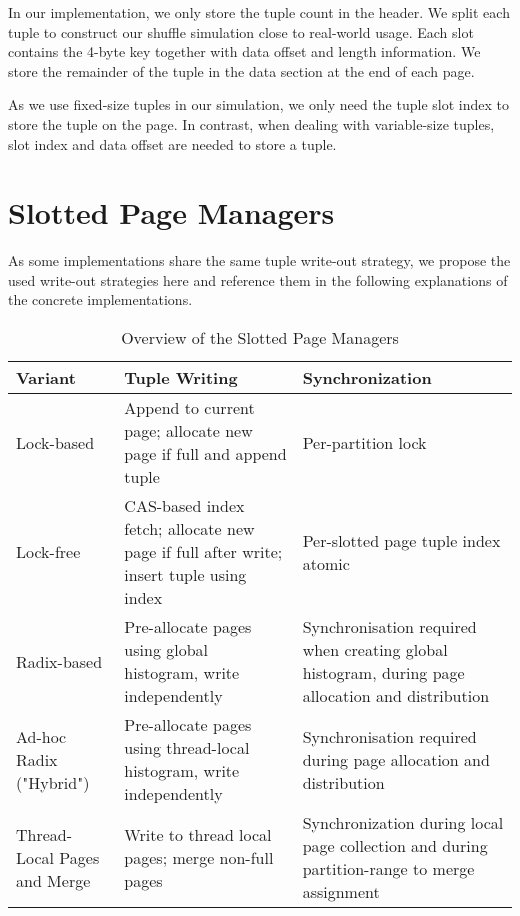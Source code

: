 In our implementation, we only store the tuple count in the header.
We split each tuple to construct our shuffle simulation close to real-world usage.
Each slot contains the 4-byte key together with data offset and length information.
We store the remainder of the tuple in the data section at the end of each page.

As we use fixed-size tuples in our simulation, we only need the tuple slot index to store the tuple on the page.
In contrast, when dealing with variable-size tuples, slot index and data offset are needed to store a tuple.

\section{Slotted Page Managers}\label{section-slotted-page-managers}
As some implementations share the same tuple write-out strategy, we propose the used write-out strategies here and reference them in the following explanations of the concrete implementations.

\begin{table}[h]
  \centering
  \small
  \begin{tabular}{|p{}|p{}|p{}|}
    \hline
    \textbf{Variant}             & \textbf{Tuple Writing}                                                                 & \textbf{Synchronization}                                                                         \\
    \hline
    Lock-based                   & Append to current page; allocate new page if full and append tuple                     & Per-partition lock                                                                               \\\hline
    Lock-free                    & CAS-based index fetch; allocate new page if full after write; insert tuple using index & Per-slotted page tuple index atomic                                                              \\\hline
    Radix-based                  & Pre-allocate pages using global histogram, write independently                         & Synchronisation required when creating global histogram, during page allocation and distribution \\\hline
    Ad-hoc Radix  ("Hybrid")     & Pre-allocate pages using thread-local histogram, write independently                   & Synchronisation required during page allocation and distribution                                 \\\hline
    Thread-Local Pages and Merge & Write to thread local pages; merge non-full pages                                      & Synchronization during local page collection and during partition-range to merge assignment      \\\hline
  \end{tabular}
  \caption{Overview of the Slotted Page Managers}
\end{table}

